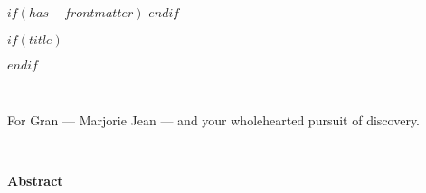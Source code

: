 $if(has-frontmatter)$
\frontmatter
$endif$

$if(title)$
\maketitle
$endif$

\clearpage
\newpage
\thispagestyle{empty} %
\mbox{~}
\clearpage
\newpage


\begin{center}
    \thispagestyle{empty}
    \vspace*{\fill}
    \begin{large}
    For Gran — Marjorie Jean — and your wholehearted pursuit of discovery.
    \end{large}
    \vspace*{\fill}
\end{center}

\clearpage
\newpage
\thispagestyle{empty} %
\mbox{~}
\clearpage
\newpage


\begin{flushleft}
\huge\textbf{Abstract}
\end{flushleft}

\vspace*{\baselineskip}

